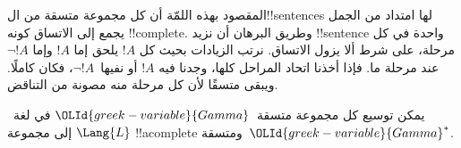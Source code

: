 \documentclass[../../../include/open-logic-section]{subfiles}
\begin{document}
      {}
      {}


\begin{explain}
المقصود بهذه اللمّة أن كل مجموعة متسقة من ال!!{sentence}s لها امتداد
من الجمل يجمع إلى الاتساق كونه !!{complete}. وطريق البرهان أن نزيد
!!{sentence} واحدة في كل مرحلة، على شرط ألا يزول الاتساق. نرتب
الزيادات بحيث كل $!A$ يلحق إما $!A$ وإما $\lnot !A$ عند مرحلة ما.
فإذا أخذنا اتحاد المراحل كلها، وجدنا فيه $!A$ أو نفيها~$\lnot !A$،
فكان كاملًا. ويبقى متسقًا لأن كل مرحلة منه مصونة من التناقض.
\end{explain}

\begin{lem}[لمّة ليندنبوم]
 يمكن توسيع كل مجموعة متسقة~$\OLId{greek-variable}{Gamma}$ في
لغة~$\Lang{L}$ إلى مجموعة !!a{complete} ومتسقة~$\OLId{greek-variable}{Gamma}^*$.
\end{lem}
\end{document}
